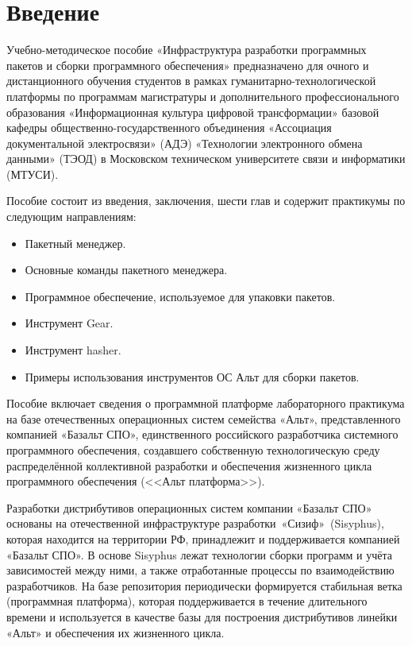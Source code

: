 \chapter{Введение}%

Учебно-методическое пособие «Инфраструктура разработки программных пакетов и сборки 
программного обеспечения» предназначено для очного и дистанционного обучения студентов 
в рамках гуманитарно-технологической платформы по программам магистратуры и 
дополнительного профессионального образования «Информационная культура цифровой 
трансформации» базовой кафедры общественно-государственного объединения «Ассоциация 
документальной электросвязи» (АДЭ) «Технологии электронного обмена данными» (ТЭОД) 
в Московском техническом университете связи и информатики (МТУСИ). 

Пособие состоит из введения, заключения, шести глав и содержит практикумы по следующим направлениям:
\begin{itemize}
	\item Пакетный менеджер.
	\item Основные команды пакетного менеджера.
	\item Программное обеспечение, используемое для упаковки пакетов.
	\item Инструмент Gear.
	\item Инструмент hasher.
	\item Примеры использования инструментов ОС Альт для сборки пакетов.
\end{itemize}

Пособие включает сведения о программной платформе лабораторного практикума на базе 
отечественных операционных систем семейства «Альт», представленного компанией «Базальт СПО», 
единственного российского разработчика системного программного обеспечения, создавшего 
собственную технологическую среду распределённой коллективной разработки и обеспечения 
жизненного цикла программного обеспечения (<<Альт платформа>>).

Разработки дистрибутивов операционных систем компании «Базальт СПО» основаны на 
отечественной инфраструктуре разработки «Сизиф» (Sisyphus), которая находится на 
территории РФ, принадлежит и поддерживается компанией «Базальт СПО». В основе 
Sisyphus лежат технологии сборки программ и учёта зависимостей между ними, а 
также отработанные процессы по взаимодействию разработчиков. На базе репозитория 
периодически формируется стабильная ветка (программная платформа), которая поддерживается 
в течение длительного времени и используется в качестве базы для построения дистрибутивов 
линейки «Альт» и обеспечения их жизненного цикла.

